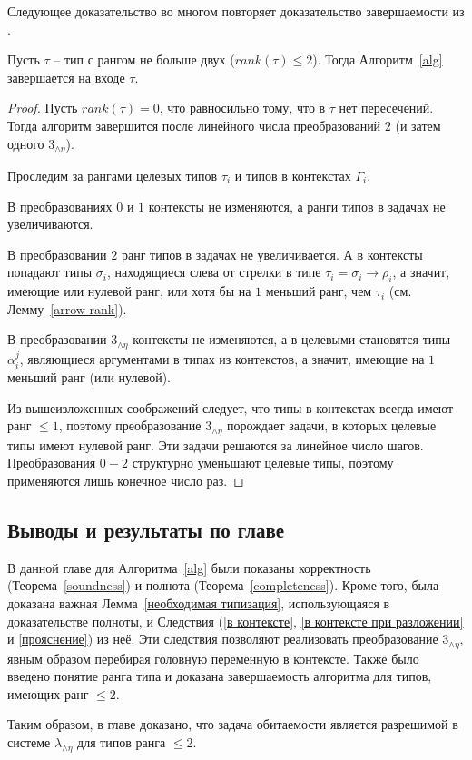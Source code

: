 \documentclass[../main.tex]{subfiles}
\begin{document}
Следующее доказательство во многом повторяет доказательство завершаемости из \cite{kusmierek_07}.
\begin{theorem}[Termination] \label{termination}
Пусть $\tau$ -- тип с рангом не больше двух ($rank(\tau) \leqslant 2$). Тогда Алгоритм~\ref{alg} завершается на входе $\tau$.
\end{theorem}
\begin{proof}
    Пусть $rank(\tau) = 0$, что равносильно тому, что в $\tau$ нет пересечений. Тогда алгоритм завершится после линейного числа преобразований $2$ (и затем одного $3_{\wedge \eta}$).
    
    Проследим за рангами целевых типов $\tau_i$ и типов в контекстах $\Gamma_i$.
    
    В преобразованиях $0$ и $1$ контексты не изменяются, а ранги типов в задачах не увеличиваются.
    
    В преобразовании $2$ ранг типов в задачах не увеличивается. А в контексты попадают 
    типы $\sigma_i$, находящиеся слева от стрелки в типе $\tau_i = \sigma_i \to \rho_i$, а значит, имеющие или нулевой ранг, или хотя бы на $1$ меньший ранг, чем $\tau_i$ (см. Лемму~\ref{arrow rank}). 
    
    В преобразовании $3_{\wedge \eta}$ контексты не изменяются, а в целевыми становятся типы $\alpha_i^j$, являющиеся аргументами в типах из контекстов, а значит, имеющие на $1$ меньший ранг (или нулевой).
    
    Из вышеизложенных соображений следует, что типы в контекстах всегда имеют ранг $\leqslant 1$, поэтому преобразование $3_{\wedge \eta}$ порождает задачи, в которых целевые типы имеют нулевой ранг. Эти задачи решаются за линейное число шагов. 
    Преобразования $0-2$ структурно уменьшают целевые типы, поэтому применяются лишь конечное число раз.
    
    
\end{proof}

\subsection{Выводы и результаты по главе}

В данной главе для Алгоритма~\ref{alg} были показаны корректность (Теорема~\ref{soundness}) и полнота (Теорема~\ref{completeness}). Кроме того, была доказана важная Лемма~\ref{необходимая типизация}, использующаяся в доказательстве полноты, и Следствия (\ref{в контексте}, \ref{в контексте при разложении} и \ref{прояснение}) из неё. Эти следствия позволяют реализовать преобразование $3_{\wedge \eta}$, явным образом перебирая головную переменную в контексте. Также было введено понятие ранга типа и доказана завершаемость алгоритма для типов, имеющих ранг $\leqslant 2$.

Таким образом, в главе доказано, что задача обитаемости является разрешимой в системе $\lambda_{\wedge \eta}$ для типов ранга $\leqslant 2$.
\end{document}
